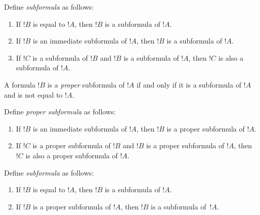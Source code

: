 \documentclass[syntax-and-semantics]{subfiles}
\begin{document}

\begin{defn}[Subformula]
Define \emph{subformula} as follows:
\begin{enumerate}
\item If $!B$ is equal to $!A$, then $!B$ is a subformula of $!A$.
\item If $!B$ is an immediate subformula of $!A$, then $!B$ is a
  subformula of $!A$.
\item If $!C$ is a subformula of $!B$ and $!B$ is a subformula of
  $!A$, then $!C$ is also a subformula of $!A$.
\end{enumerate}
A formula $!B$ is a \emph{proper} subformula of $!A$ if and only if it
is a subformula of $!A$ and is not equal to $!A$.
\end{defn}


\begin{defn}
Define \emph{proper subformula} as follows:
\begin{enumerate}
\item If $!B$ is an immediate subformula of $!A$, then $!B$ is a
  proper subformula of $!A$.
\item If $!C$ is a proper subformula of $!B$ and $!B$ is a proper
  subformula of $!A$, then $!C$ is also a proper subformula of $!A$.
\end{enumerate}
\end{defn}

\begin{defn}[Subformula]
Define \emph{subformula} as follows:
\begin{enumerate}
\item If $!B$ is equal to $!A$, then $!B$ is a subformula of $!A$.
\item If $!B$ is a proper subformula of $!A$, then $!B$ is a
  subformula of~$!A$.
\end{enumerate}
\end{defn}

\end{document}
